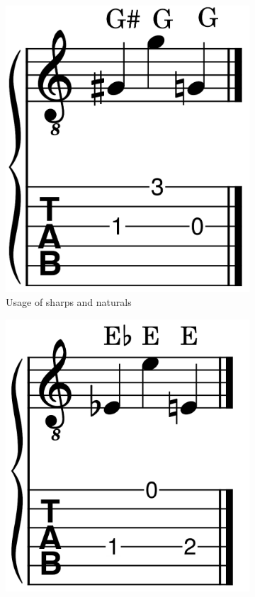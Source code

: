 \begin{figure}[h]
	\begin{subfigure}[b]{0.45\textwidth}
		\centering
		\includegraphics[height=0.15\textheight]{../../MuseScore/Guitar/GuitarSharpApplyExample.png}
		\caption{Usage of sharps and naturals}
		\label{fig:guitar_usage_of_sharps_and_naturals}
	\end{subfigure}
	\hfill
	\begin{subfigure}[b]{0.45\textwidth}
		\centering
		\includegraphics[height=0.15\textheight]{../../MuseScore/Guitar/GuitarFlatApplyExample.png}

\end{subfigure}
\end{figure}
